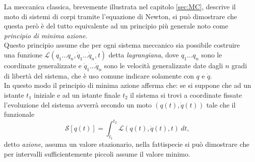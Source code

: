 \label{sec:MinimaAzione}
La meccanica classica, brevemente illustrata nel capitolo \ref{sec:MC}, descrive il moto di sistemi di corpi tramite l'equazione di Newton, si può dimostrare che questa però è del tutto equivalente ad un principio più generale noto come \emph{principio di minima azione}.\\ Questo principio assume che per ogni sistema meccanico sia possibile costruire una funzione $\mathcal{L}(q_1...q_n,\dot{q}_1...\dot{q}_n,t)$ detta \emph{lagrangiana}, dove $q_1...q_n$ sono le coordinate generalizzate e $\dot{q}_1...\dot{q}_n$ sono le velocità generalizzate date dagli $n$ gradi di libertà del sistema, che è uso comune indicare solamente con $q$ e $\dot{q}$.\\ In questo modo il principio di minima azione afferma che: se si suppone che ad un istante $t_1$ iniziale e ad un istante finale $t_2$ il sistema si trovi a coordinate fissate l'evoluzione del sistema avverrà secondo un moto $(q(t),\dot{q}(t))$ tale che il funzionale 
\begin{equation}
    \label{Azione}
    \mathcal{S}[q(t)] =\int_{t_1}^{t_2} \mathcal{L}(q(t),\dot{q}(t),t)\ dt,
\end{equation}
detto \emph{azione}, assuma un valore stazionario, nella fattispecie si può dimostrare che per intervalli sufficientemente piccoli assume il valore minimo.\\

